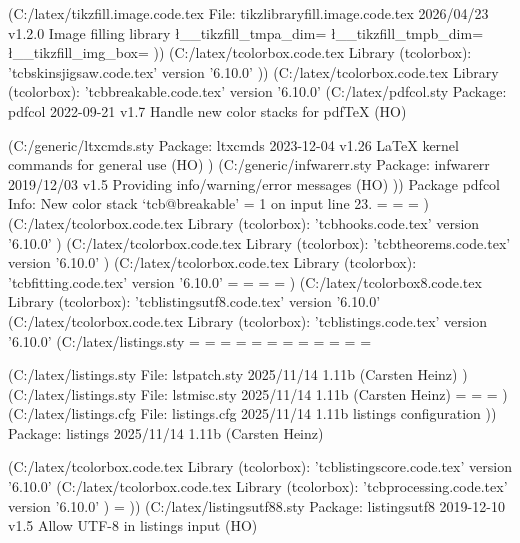 (C:\MikTeX\tex/latex/tikzfill\tikzlibraryfill.image.code.tex
File: tikzlibraryfill.image.code.tex 2026/04/23 v1.2.0 Image filling library
\l__tikzfill_tmpa_dim=
\l__tikzfill_tmpb_dim=
\l__tikzfill_img_box=
))
(C:\MikTeX\tex/latex/tcolorbox\tcbskinsjigsaw.code.tex
Library (tcolorbox): 'tcbskinsjigsaw.code.tex' version '6.10.0'
)) (C:\MikTeX\tex/latex/tcolorbox\tcbbreakable.code.tex
Library (tcolorbox): 'tcbbreakable.code.tex' version '6.10.0'
(C:\MikTeX\tex/latex/pdfcol\pdfcol.sty
Package: pdfcol 2022-09-21 v1.7 Handle new color stacks for pdfTeX (HO)

(C:\MikTeX\tex/generic/ltxcmds\ltxcmds.sty
Package: ltxcmds 2023-12-04 v1.26 LaTeX kernel commands for general use (HO)
)
(C:\MikTeX\tex/generic/infwarerr\infwarerr.sty
Package: infwarerr 2019/12/03 v1.5 Providing info/warning/error messages (HO)
))
Package pdfcol Info: New color stack `tcb@breakable' = 1 on input line 23.
\tcb@testbox=
\tcb@totalupperbox=
\tcb@totallowerbox=
)
(C:\MikTeX\tex/latex/tcolorbox\tcbhooks.code.tex
Library (tcolorbox): 'tcbhooks.code.tex' version '6.10.0'
) (C:\MikTeX\tex/latex/tcolorbox\tcbtheorems.code.tex
Library (tcolorbox): 'tcbtheorems.code.tex' version '6.10.0'
) (C:\MikTeX\tex/latex/tcolorbox\tcbfitting.code.tex
Library (tcolorbox): 'tcbfitting.code.tex' version '6.10.0'
\tcbfitdim=
\tcb@lowerfitdim=
\tcb@upperfitdim=
\tcb@cur@hbadness=
) (C:\MikTeX\tex/latex/tcolorbox\tcblistingsutf8.code.tex
Library (tcolorbox): 'tcblistingsutf8.code.tex' version '6.10.0'
(C:\MikTeX\tex/latex/tcolorbox\tcblistings.code.tex
Library (tcolorbox): 'tcblistings.code.tex' version '6.10.0'
(C:\MikTeX\tex/latex/listings\listings.sty
\lst@mode=
\lst@gtempboxa=
\lst@token=
\lst@length=
\lst@currlwidth=
\lst@column=
\lst@pos=
\lst@lostspace=
\lst@width=
\lst@newlines=
\lst@lineno=
\lst@maxwidth=

(C:\MikTeX\tex/latex/listings\lstpatch.sty
File: lstpatch.sty 2025/11/14 1.11b (Carsten Heinz)
)
(C:\MikTeX\tex/latex/listings\lstmisc.sty
File: lstmisc.sty 2025/11/14 1.11b (Carsten Heinz)
\c@lstnumber=
\lst@skipnumbers=
\lst@framebox=
)
(C:\MikTeX\tex/latex/listings\listings.cfg
File: listings.cfg 2025/11/14 1.11b listings configuration
))
Package: listings 2025/11/14 1.11b (Carsten Heinz)

(C:\MikTeX\tex/latex/tcolorbox\tcblistingscore.code.tex
Library (tcolorbox): 'tcblistingscore.code.tex' version '6.10.0'
(C:\MikTeX\tex/latex/tcolorbox\tcbprocessing.code.tex
Library (tcolorbox): 'tcbprocessing.code.tex' version '6.10.0'
)
\c@tcblisting=
)) (C:\MikTeX\tex/latex/listingsutf8\listingsutf8.sty
Package: listingsutf8 2019-12-10 v1.5 Allow UTF-8 in listings input (HO)

